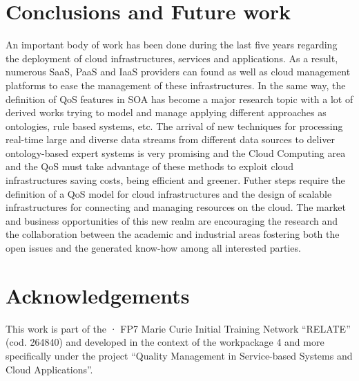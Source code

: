 \documentclass[preprint,12pt]{elsarticle}
\begin{document}
\section{Conclusions and Future work}\label{sect:conclusions}
An important body of work has been done during the last five years regarding the deployment of cloud infrastructures, services and applications. As a result, numerous SaaS, PaaS and IaaS providers can found as well as cloud management platforms to ease the management of these infrastructures. In the same way, the definition of QoS features in SOA has become a major research topic with a lot of derived works trying to model and manage applying different approaches as ontologies, rule based systems, etc. The arrival of new techniques for processing real-time large and diverse data streams from different data sources to deliver ontology-based expert systems is very promising and the Cloud Computing area and the QoS must take advantage of these methods to exploit cloud infrastructures saving costs, being efficient and greener. Futher steps require the definition of a QoS model for cloud infrastructures and the design of scalable infrastructures for connecting and managing resources on the cloud. The market and 
business opportunities of this new realm are encouraging the research and the collaboration between the academic and industrial areas fostering both the open issues and the generated know-how among all interested parties.
\section{Acknowledgements}\label{sect:ack}
This work is part of the · FP7 Marie Curie Initial Training Network ``RELATE'' (cod. 264840) and developed in the context of the workpackage 4 and more 
specifically under the project ``Quality Management in Service-based Systems and Cloud Applications''.

% 


\end{document}
